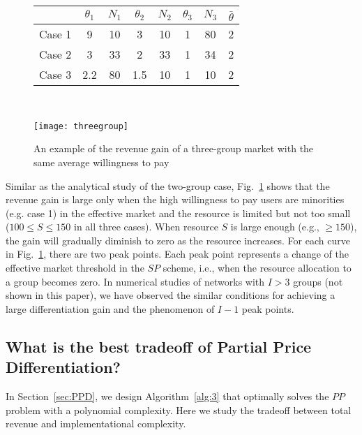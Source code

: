 \documentclass[twocolumn,10pt,twosided]{IEEEtran}
\makeatletter
\newcommand\tabcaption{\def\@captype{table}\caption}
\makeatother
\begin{document}
\begin{figure}[htb]
\begin{minipage}[c]{0.5\textwidth}
\centering
\tabcaption{Parameter settings of a three-group example}
\begin{tabular}{l|cc|cc|cc|c}
  \hline
   & $\theta_1$ & $N_1$ & $\theta_2$ & $N_2$ & $\theta_3$ & $N_3$ & $\overset{}{\bar{\theta}} $\\
  \hline
  Case 1 &9  & 10 & 3 & 10 &1  & 80 &2\\
  \hline
  Case 2 & 3 & 33 & 2 & 33 & 1 & 34 &2\\
  \hline
  Case 3 & 2.2 & 80 & 1.5 & 10 & 1 & 10 &2\\
  \hline
\end{tabular}
\label{tab:three_group}
\end{minipage}\\[4pt]
\begin{minipage}[c]{0.45\textwidth}
\centering
\texttt{[image: threegroup]}
\caption{An example of the revenue gain of a three-group market with the same average willingness to pay}
\label{fig:threegroup}
\end{minipage}
\end{figure}


Similar as the analytical study of the two-group case, Fig.~\ref{fig:threegroup} shows that the revenue gain is large only when the high willingness to pay users are minorities
(e.g. case 1) in the effective market and the resource is limited  but not too small ($100\le S\le 150$ in all three cases). When resource $S$ is large enough (e.g., $\ge 150$), the gain will gradually diminish to zero as the resource increases. For each curve in Fig.~\ref{fig:threegroup}, there are two peak points. Each peak point represents a change of the effective market threshold in the $SP$ scheme, i.e., when the resource allocation to a group becomes zero. In numerical studies of networks with $I>3$ groups  (not shown in this paper), we have observed the similar conditions for achieving a large differentiation gain and the phenomenon of $I-1$ peak points.


\subsection{What is the best tradeoff of Partial Price Differentiation?}
\label{sub:PPD_Numerical}
In Section~\ref{sec:PPD}, we design Algorithm~\ref{alg:3} that
optimally solves the $PP$ problem with a polynomial complexity.  Here we study the tradeoff between total revenue and implementational complexity.
\end{document}

